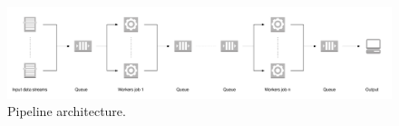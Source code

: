 \begin{figure}
  \centering
  \includegraphics[width=.99\textwidth]{images/architecture_pipeline}
  \caption{Pipeline architecture.}
  \label{fig:architecture_pipeline}
\end{figure}
